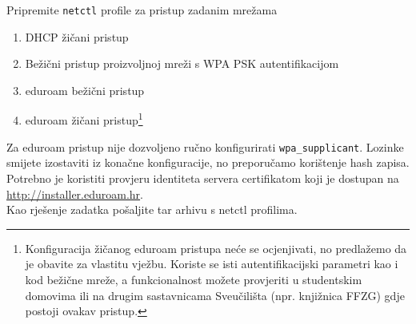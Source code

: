 \documentclass[12pt,a4paper]{article}
\begin{document}
Pripremite \texttt{netctl} profile za pristup zadanim mrežama
\begin{enumerate}
	\item DHCP žičani pristup
	\item Bežični pristup proizvoljnoj mreži s WPA PSK autentifikacijom
	\item eduroam bežični pristup
	\item eduroam žičani pristup\footnote{Konfiguracija žičanog eduroam pristupa neće se ocjenjivati, no predlažemo da je obavite za vlastitu vježbu. Koriste se isti autentifikacijski parametri kao i kod bežične mreže, a funkcionalnost možete provjeriti u studentskim domovima ili na drugim sastavnicama Sveučilišta (npr. knjižnica FFZG) gdje postoji ovakav pristup.}
\end{enumerate}
Za eduroam pristup nije dozvoljeno ručno konfigurirati \texttt{wpa\_supplicant}. Lozinke smijete izostaviti iz konačne konfiguracije, no preporučamo korištenje hash zapisa. Potrebno je koristiti provjeru identiteta servera certifikatom koji je dostupan na \url{http://installer.eduroam.hr}.\\

Kao rješenje zadatka pošaljite tar arhivu s netctl profilima.
\end{document}
